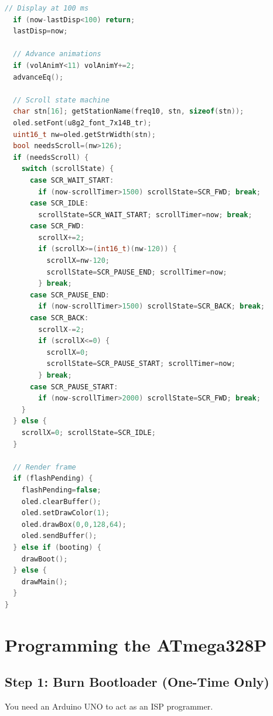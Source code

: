 \documentclass[a4paper,11pt]{article}
\renewcommand*{\,}{ }%
\begin{document}
\begin{lstlisting}[language=C++, caption={FM Pocket Radio --- ATmega328P Firmware Rev 2 (fm\_pocket\_radio.ino)}]
  // Display at 100 ms
  if (now-lastDisp<100) return;
  lastDisp=now;

  // Advance animations
  if (volAnimY<11) volAnimY+=2;
  advanceEq();

  // Scroll state machine
  char stn[16]; getStationName(freq10, stn, sizeof(stn));
  oled.setFont(u8g2_font_7x14B_tr);
  uint16_t nw=oled.getStrWidth(stn);
  bool needsScroll=(nw>126);
  if (needsScroll) {
    switch (scrollState) {
      case SCR_WAIT_START:
        if (now-scrollTimer>1500) scrollState=SCR_FWD; break;
      case SCR_IDLE:
        scrollState=SCR_WAIT_START; scrollTimer=now; break;
      case SCR_FWD:
        scrollX+=2;
        if (scrollX>=(int16_t)(nw-120)) {
          scrollX=nw-120;
          scrollState=SCR_PAUSE_END; scrollTimer=now;
        } break;
      case SCR_PAUSE_END:
        if (now-scrollTimer>1500) scrollState=SCR_BACK; break;
      case SCR_BACK:
        scrollX-=2;
        if (scrollX<=0) {
          scrollX=0;
          scrollState=SCR_PAUSE_START; scrollTimer=now;
        } break;
      case SCR_PAUSE_START:
        if (now-scrollTimer>2000) scrollState=SCR_FWD; break;
    }
  } else {
    scrollX=0; scrollState=SCR_IDLE;
  }

  // Render frame
  if (flashPending) {
    flashPending=false;
    oled.clearBuffer();
    oled.setDrawColor(1);
    oled.drawBox(0,0,128,64);
    oled.sendBuffer();
  } else if (booting) {
    drawBoot();
  } else {
    drawMain();
  }
}
\end{lstlisting}

\section{Programming the ATmega328P}
\label{sec:programming}

\subsection{Step 1: Burn Bootloader (One-Time Only)}

You need an Arduino UNO to act as an ISP programmer.
\end{document}
